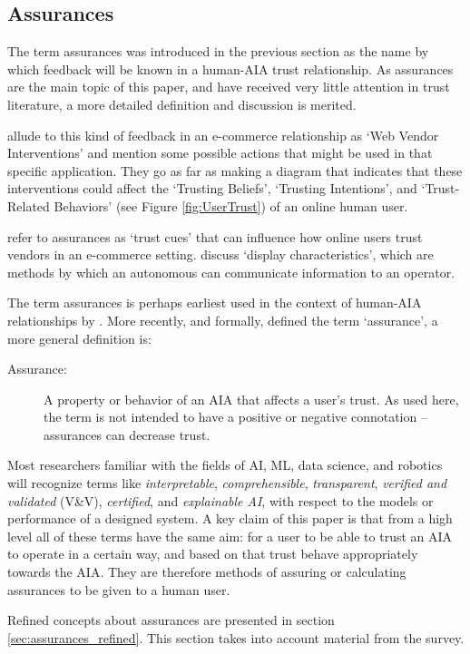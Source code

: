\subsection{Assurances} \label{sec:assurances}
    The term assurances was introduced in the previous section as the name by which feedback will be known in a human-AIA trust relationship. As assurances are the main topic of this paper, and have received very little attention in trust literature, a more detailed definition and discussion is merited.

    \citet{McKnight2001-fa} allude to this kind of feedback in an e-commerce relationship as `Web Vendor Interventions' and mention some possible actions that might be used in that specific application. They go as far as making a diagram that indicates that these interventions could affect the `Trusting Beliefs', `Trusting Intentions', and `Trust-Related Behaviors' (see Figure \ref{fig:UserTrust}) of an online human user.

    \citet{Corritore2003-gx} refer to assurances as `trust cues' that can influence how online users trust vendors in an e-commerce setting. \citet{Lee2004-pv} discuss `display characteristics', which are methods by which an autonomous can communicate information to an operator.
    
    The term assurances is perhaps earliest used in the context of human-AIA relationships by \citet{Sheridan1984-kx}. More recently, and formally, \citet{Lillard2016-yg} defined the term `assurance', a more general definition is:
    
    \begin{description}
        \item [Assurance:] A property or behavior of an AIA that affects a user's trust. As used here, the term is not intended to have a positive or negative connotation -- assurances can decrease trust.
    \end{description}

    Most researchers familiar with the fields of AI, ML, data science, and robotics will recognize terms like \emph{interpretable}, \emph{comprehensible}, \emph{transparent}, \emph{verified and validated} (V\&V), \emph{certified}, and \emph{explainable AI}, with respect to the models or performance of a designed system. A key claim of this paper is that from a high level all of these terms have the same aim: for a user to be able to trust an AIA to operate in a certain way, and based on that trust behave appropriately towards the AIA. They are therefore methods of assuring or calculating assurances to be given to a human user.

    Refined concepts about assurances are presented in section \ref{sec:assurances_refined}. This section takes into account material from the survey.
%


